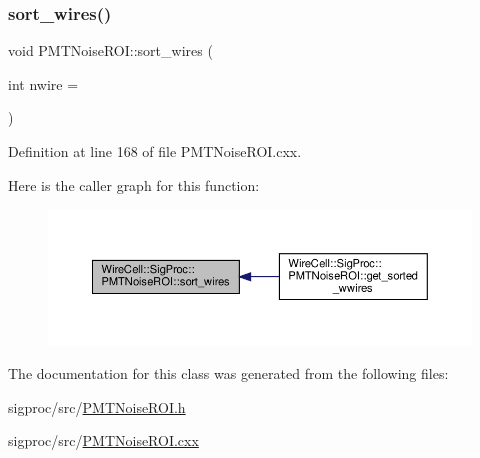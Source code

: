 \subsubsection{\texorpdfstring{sort\+\_\+wires()}{sort\_wires()}}
{\footnotesize\ttfamily void P\+M\+T\+Noise\+R\+O\+I\+::sort\+\_\+wires (\begin{DoxyParamCaption}\item[{int}]{nwire = {} }\end{DoxyParamCaption})}



Definition at line 168 of file P\+M\+T\+Noise\+R\+O\+I.\+cxx.

Here is the caller graph for this function\+:
\nopagebreak
\begin{figure}[H]
\begin{center}
\leavevmode
\includegraphics[width=350pt]{class_wire_cell_1_1_sig_proc_1_1_p_m_t_noise_r_o_i_adcf6d65537ca5b9853a3801251f97d8e_icgraph}
\end{center}
\end{figure}


The documentation for this class was generated from the following files\+:\begin{DoxyCompactItemize}
\item 
sigproc/src/\hyperlink{_p_m_t_noise_r_o_i_8h}{P\+M\+T\+Noise\+R\+O\+I.\+h}\item 
sigproc/src/\hyperlink{_p_m_t_noise_r_o_i_8cxx}{P\+M\+T\+Noise\+R\+O\+I.\+cxx}\end{DoxyCompactItemize}
